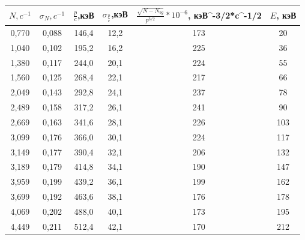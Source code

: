 \documentclass[a4paper,12pt]{report}
\begin{document}
\begin{table}[H]
\begin{tabular}{|c|c|c|c|c|c|}
\hline
$N,   c^{-1}$ & $\sigma_{N}, c^{-1}$ & $\frac{p}{c}$,кэВ & $\sigma_{\frac{p}{c}}$,кэВ & $\frac{\sqrt{N-N_{bg}}}{p^{3/2}}*10^{-6}$, кэВ^{-3/2}*c^{-1/2}  & $E$, кэВ \\ \hline
0,770          & 0,088             & 146,4    & 12,2           & 173                                     & 20     \\ \hline
1,040          & 0,102             & 195,2    & 16,2           & 225                                     & 36     \\ \hline
1,380          & 0,117             & 244,0    & 20,1           & 224                                     & 55     \\ \hline
1,560          & 0,125             & 268,4    & 22,1           & 217                                     & 66     \\ \hline
2,049          & 0,143             & 292,8    & 24,1           & 237                                     & 78     \\ \hline
2,489          & 0,158             & 317,2    & 26,1           & 241                                     & 90     \\ \hline
2,669          & 0,163             & 341,6    & 28,1           & 226                                     & 103    \\ \hline
3,099          & 0,176             & 366,0    & 30,1           & 224                                     & 117    \\ \hline
3,149          & 0,177             & 390,4    & 32,1           & 206                                     & 132    \\ \hline
3,189          & 0,179             & 414,8    & 34,1           & 190                                     & 147    \\ \hline
3,959          & 0,199             & 439,2    & 36,1           & 199                                     & 162    \\ \hline
3,699          & 0,192             & 463,6    & 38,1           & 176                                     & 178    \\ \hline
4,069          & 0,202             & 488,0    & 40,1           & 173                                     & 195    \\ \hline
4,449          & 0,211             & 512,4    & 42,1           & 170                                     & 212    \\ \hline

\end{tabular}
\end{table}
\end{document}
